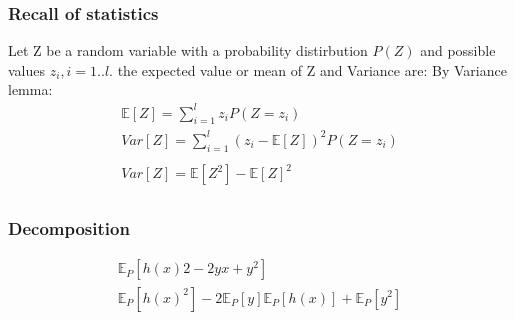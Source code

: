 \documentclass[12pt]{book}
\begin{document}
\subsubsection{Recall of statistics}
Let Z be a random variable with a probability distirbution $P(Z)$ and possible values $z_i, i=1..l$. the expected value or mean of Z and Variance are:
By Variance lemma:
\begin{equation}
	\begin{aligned}
		\mathbb{E}[Z] = \sum_{i=1}^l z_i P(Z=z_i)\\
		Var[Z] = \sum_{i=1}^l (z_i - \mathbb{E}[Z])^2 P(Z=z_i)\\\\
	        Var[Z] = \mathbb{E}[Z^2] - \mathbb{E}[Z]^2\\
	\end{aligned}
\end{equation}

\subsubsection{Decomposition}
\begin{equation}
	\begin{aligned}
		\mathbb{E}_P[h(x)2 - 2yx + y^2]\\
		\mathbb{E}_P[h(x)^2] - 2\mathbb{E}_P[y]\mathbb{E}_P[h(x)] + \mathbb{E}_P[y^2]\\
	\end{aligned}
\end{equation}
\end{document}
